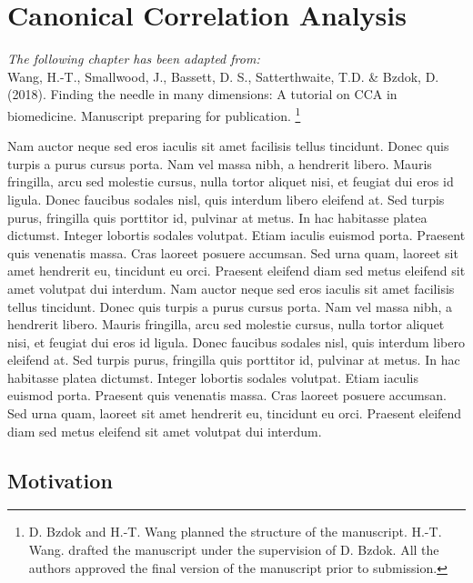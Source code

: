 \chapter{Canonical Correlation Analysis}
\label{ch:methods}


\textit{The following chapter has been adapted from:\\}
Wang, H.-T., Smallwood, J., Bassett, D. S., Satterthwaite, T.D. \& Bzdok, D. (2018). Finding the needle in many dimensions: A tutorial on CCA in biomedicine. Manuscript preparing for publication.
\footnote{
D. Bzdok and H.-T. Wang planned the structure of the manuscript.  H.-T. Wang. drafted the manuscript under the supervision of D. Bzdok. All the authors approved the final version of the manuscript prior to submission.}\\
\newpage

\noindent{}Nam auctor neque sed eros iaculis sit amet facilisis tellus tincidunt. Donec quis turpis a purus cursus porta. Nam vel massa nibh, a hendrerit libero. Mauris fringilla, arcu sed molestie cursus, nulla tortor aliquet nisi, et feugiat dui eros id ligula. Donec faucibus sodales nisl, quis interdum libero eleifend at. Sed turpis purus, fringilla quis porttitor id, pulvinar at metus. In hac habitasse platea dictumst. Integer lobortis sodales volutpat. Etiam iaculis euismod porta. Praesent quis venenatis massa. Cras laoreet posuere accumsan. Sed urna quam, laoreet sit amet hendrerit eu, tincidunt eu orci. Praesent eleifend diam sed metus eleifend sit amet volutpat dui interdum. Nam auctor neque sed eros iaculis sit amet facilisis tellus tincidunt. Donec quis turpis a purus cursus porta. Nam vel massa nibh, a hendrerit libero. Mauris fringilla, arcu sed molestie cursus, nulla tortor aliquet nisi, et feugiat dui eros id ligula. Donec faucibus sodales nisl, quis interdum libero eleifend at. Sed turpis purus, fringilla quis porttitor id, pulvinar at metus. In hac habitasse platea dictumst. Integer lobortis sodales volutpat. Etiam iaculis euismod porta. Praesent quis venenatis massa. Cras laoreet posuere accumsan. Sed urna quam, laoreet sit amet hendrerit eu, tincidunt eu orci. Praesent eleifend diam sed metus eleifend sit amet volutpat dui interdum.



\section{Motivation}
\label{CCA:motivation}

